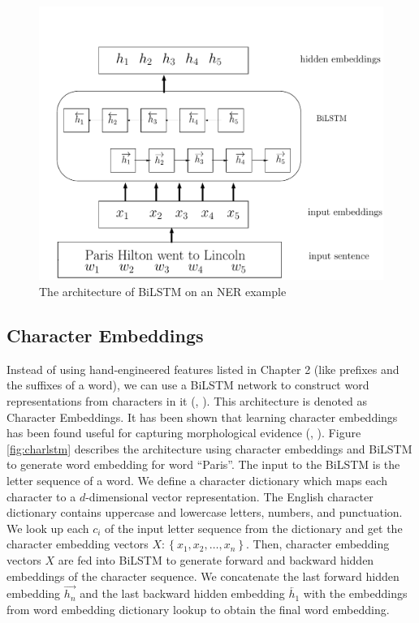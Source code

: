 \begin{figure}
  \centering
  \includegraphics[scale=0.6]{bilstm.pdf}
 \caption{The architecture of BiLSTM on an NER example}
  \label{fig:bilstm}
\end{figure}

\subsection{Character Embeddings}

Instead of using hand-engineered features listed in Chapter 2 (like prefixes and the suffixes of a word), we can use a BiLSTM network to construct word representations from characters in it (\citeauthor{lample2016neural}, \citeyear{lample2016neural}). This architecture is denoted as Character Embeddings. It has been shown that learning character embeddings has been found useful for capturing morphological evidence (\citeauthor{ling2015finding}, \citeyear{ling2015finding}). Figure \ref{fig:charlstm} describes the architecture using character embeddings and BiLSTM to generate word embedding for word ``Paris''. The input to the BiLSTM is the letter sequence of a word. We define a character dictionary which maps each character to a $d$-dimensional vector representation. The English character dictionary contains uppercase and lowercase letters, numbers, and punctuation. We look up each $c_{i}$ of the input letter sequence from the dictionary and get the character embedding vectors $X:\left\{x_{1},x_{2},\dots,x_{n}\right\}$. Then, character embedding vectors $X$ are fed into BiLSTM to generate forward and backward hidden embeddings of the character sequence. We concatenate the last forward hidden embedding $\overrightarrow {h_{n}}$ and the last backward hidden embedding $\overleftarrow {h_{1}}$ with the embeddings from word embedding dictionary lookup to obtain the final word embedding.

